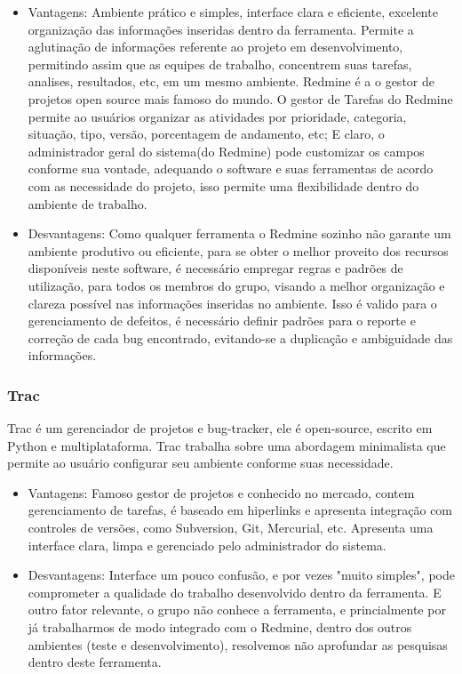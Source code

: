 \documentclass[12pt,a4paper]{article}
\begin{document}
		\begin{itemize}
			\item Vantagens: 
			Ambiente prático e simples, interface clara e eficiente, excelente organização das informações inseridas dentro da ferramenta. Permite a aglutinação de informações referente ao projeto em desenvolvimento, permitindo assim que as equipes de trabalho, concentrem suas tarefas, analises, resultados, etc, em um mesmo ambiente. 
			Redmine é a o gestor de projetos open source mais famoso do mundo.
			O gestor de Tarefas do Redmine permite ao usuários organizar as atividades por prioridade, categoria, situação, tipo, versão, porcentagem de andamento, etc; E claro, o administrador geral do sistema(do Redmine) pode customizar os campos conforme sua vontade, adequando o software e suas ferramentas de acordo com as necessidade do projeto, isso permite uma flexibilidade dentro do ambiente de trabalho.
			
			
			\item Desvantagens: 
			Como qualquer ferramenta o Redmine sozinho não garante um ambiente produtivo ou eficiente, para se obter o melhor proveito dos recursos disponíveis neste software, é necessário empregar regras e padrões de utilização, para todos os membros do grupo, visando a melhor organização e clareza possível nas informações inseridas no ambiente. Isso é valido para o gerenciamento de defeitos, é necessário definir padrões para o reporte e correção de cada bug encontrado, evitando-se a duplicação e ambiguidade das informações. 
				
		\end{itemize}
		
		\subsubsection{Trac}
		
			Trac é um gerenciador de projetos e bug-tracker, ele é open-source, escrito em Python e multiplataforma. Trac trabalha sobre uma abordagem minimalista que permite ao usuário configurar seu ambiente conforme suas necessidade. 
		
		\begin{itemize}
			\item Vantagens: 
				Famoso gestor de projetos e conhecido no mercado, contem gerenciamento de tarefas, é baseado em hiperlinks e apresenta integração com controles de versões, como Subversion, Git, Mercurial, etc. Apresenta uma interface clara, limpa e gerenciado pelo administrador do sistema. 
		
			\item Desvantagens: 
				Interface um pouco confusão, e por vezes "muito simples", pode comprometer a qualidade do trabalho desenvolvido dentro da ferramenta.
				E outro fator relevante, o grupo não conhece a ferramenta, e princialmente por já trabalharmos de modo integrado com o Redmine, dentro dos outros ambientes (teste e desenvolvimento), resolvemos não aprofundar as pesquisas dentro deste ferramenta.
			
		\end{itemize}
		
\end{document}
